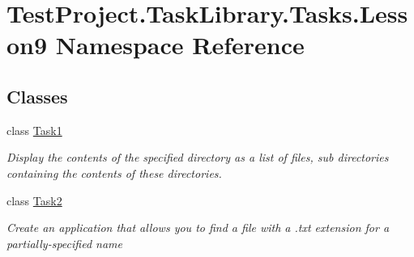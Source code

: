 \hypertarget{namespace_test_project_1_1_task_library_1_1_tasks_1_1_lesson9}{}\section{Test\+Project.\+Task\+Library.\+Tasks.\+Lesson9 Namespace Reference}
\label{namespace_test_project_1_1_task_library_1_1_tasks_1_1_lesson9}
\subsection*{Classes}
\begin{DoxyCompactItemize}
\item 
class \mbox{\hyperlink{class_test_project_1_1_task_library_1_1_tasks_1_1_lesson9_1_1_task1}{Task1}}
\begin{DoxyCompactList}\small\item\em Display the contents of the specified directory as a list of files, sub directories containing the contents of these directories. \end{DoxyCompactList}\item 
class \mbox{\hyperlink{class_test_project_1_1_task_library_1_1_tasks_1_1_lesson9_1_1_task2}{Task2}}
\begin{DoxyCompactList}\small\item\em Create an application that allows you to find a file with a .txt extension for a partially-\/specified name \end{DoxyCompactList}\end{DoxyCompactItemize}
